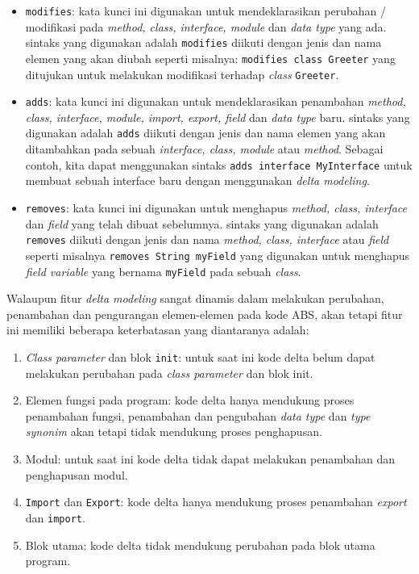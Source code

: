 \begin{itemize}
    \item \texttt{modifies}: kata kunci ini digunakan untuk mendeklarasikan perubahan / modifikasi pada \textit{method, class, interface, module} dan \textit{data type} yang ada. sintaks yang digunakan adalah \texttt{modifies} diikuti dengan jenis dan nama elemen yang akan diubah seperti misalnya: \texttt{modifies class Greeter} yang ditujukan untuk melakukan modifikasi terhadap \textit{class} \texttt{Greeter}.
    \item \texttt{adds}: kata kunci ini digunakan untuk mendeklarasikan penambahan \textit{method, class, interface, module, import, export, field} dan \textit{data type} baru. sintaks yang digunakan adalah \texttt{adds} diikuti dengan jenis dan nama elemen yang akan ditambahkan pada sebuah \textit{interface, class, module} atau \textit{method}. Sebagai contoh, kita dapat menggunakan sintaks \texttt{adds interface MyInterface} untuk membuat sebuah interface baru dengan menggunakan \textit{delta modeling}.
    \item \texttt{removes}: kata kunci ini digunakan untuk menghapus \textit{method, class, interface} dan \textit{field} yang telah dibuat sebelumnya. sintaks yang digunakan adalah \texttt{removes} diikuti dengan jenis dan nama \textit{method, class, interface} atau \textit{field} seperti misalnya \texttt{removes String myField} yang digunakan untuk menghapus \textit{field variable} yang bernama \texttt{myField} pada sebuah \textit{class}.
\end{itemize}

Walaupun fitur \textit{delta modeling} sangat dinamis dalam melakukan perubahan, penambahan dan pengurangan elemen-elemen pada kode ABS, akan tetapi fitur ini memiliki beberapa keterbatasan yang diantaranya adalah:

\begin{enumerate}
    \item \textit{Class parameter} dan blok \texttt{init}: untuk saat ini kode delta belum dapat melakukan perubahan pada \textit{class parameter} dan blok init.
    \item Elemen fungsi pada program: kode delta hanya mendukung proses penambahan fungsi, penambahan dan pengubahan \textit{data type} dan \textit{type synonim} akan tetapi tidak mendukung proses penghapusan.
    \item Modul: untuk saat ini kode delta tidak dapat melakukan penambahan dan penghapusan modul.
    \item \texttt{Import} dan \texttt{Export}: kode delta hanya mendukung proses penambahan \textit{export} dan \texttt{import}.
    \item Blok utama: kode delta tidak mendukung perubahan pada blok utama program.
\end{enumerate}